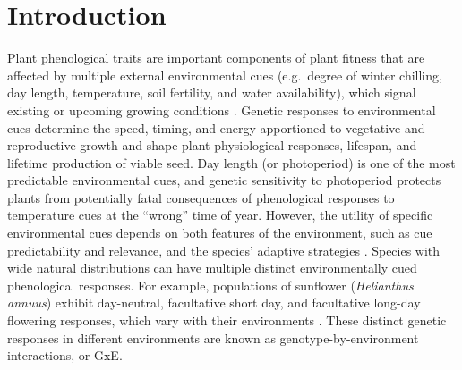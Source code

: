 \documentclass[
  9pt,
  twocolumn,
  twoside]{simple-article}%
\begin{document}
\section{Introduction}\label{introduction}

Plant phenological traits are important components of plant fitness that
are affected by multiple external environmental cues (e.g.~degree of
winter chilling, day length, temperature, soil fertility, and water
availability), which signal existing or upcoming growing conditions
\citep{bauerle_photoperiodic_2012, andres2012genetic, korner2010phenology, maple2024}.
Genetic responses to environmental cues determine the speed, timing, and
energy apportioned to vegetative and reproductive growth and shape plant
physiological responses, lifespan, and lifetime production of viable
seed. Day length (or photoperiod) is one of the most predictable
environmental cues, and genetic sensitivity to photoperiod protects
plants from potentially fatal consequences of phenological responses to
temperature cues at the ``wrong'' time of year. However, the utility of
specific environmental cues depends on both features of the environment,
such as cue predictability and relevance, and the species' adaptive
strategies \citet{botero2015evolutionary}. Species with wide natural
distributions can have multiple distinct environmentally cued
phenological responses. For example, populations of sunflower
(\emph{Helianthus annuus}) exhibit day-neutral, facultative short day,
and facultative long-day flowering responses, which vary with their
environments \citep{blackman2013interacting, henry2014transitions}.
These distinct genetic responses in different environments are known as
genotype-by-environment interactions, or GxE.
\end{document}
